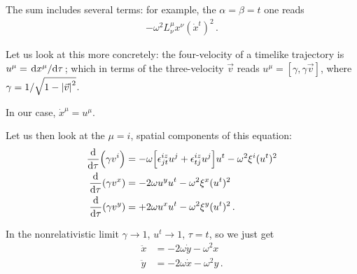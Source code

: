\documentclass[main.tex]{subfiles}
\begin{document}
\begin{extracontent}
The sum includes several terms: for example, the \(\alpha = \beta = t\) one reads 
%
\begin{align}
- \omega^2 L^{\mu }_{\nu } x^{\nu } (\dot{x}^{t} )^2
\,.
\end{align}

Let us look at this more concretely: the four-velocity of a timelike trajectory is \(u^{\mu } = \dv*{x^{\mu }}{\tau }\); which in terms of the three-velocity \(\vec{v}\) reads \(u^{\mu } = [\gamma , \gamma \vec{v}]\), where \(\gamma = 1 / \sqrt{1 - \abs{\vec{v}}^2}\). 

In our case, \(\dot{x}^{\mu } = u^{\mu }\). 

Let us then look at the \(\mu = i\), spatial components of this equation: 
%
\begin{align}
\dv{}{\tau } \qty(\gamma v^{i}) &=
- \omega \qty[
    \epsilon^{iz}_{jt} u^{j}
    + \epsilon^{iz}_{tj} u^{j}
    ] u^{t} 
- \omega^2 \xi^{i}
(u^{t})^2  \\
\dv{}{\tau } \qty(\gamma v^{x} ) &= - 2\omega u^{y} u^{t} - \omega^2 \xi^{x} (u^{t})^2 \\
\dv{}{\tau } \qty(\gamma v^{y} ) &= + 2\omega u^{x} u^{t} - \omega^2 \xi^{y} (u^{t})^2 
\,.
\end{align}


In the nonrelativistic limit \(\gamma \to 1\), \(u^{t} \to 1\), \(\tau = t\), so we just get 
%
\begin{align}
\ddot{x} &= - 2 \omega \dot{y} - \omega^2 x  \\
\ddot{y} &= - 2 \omega \dot{x} - \omega^2 y   
\,.
\end{align}
\end{extracontent}
\end{document}
